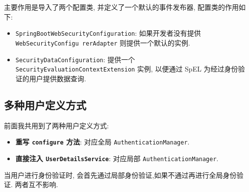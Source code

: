 主要作用是导入了两个配置类, 并定义了一个默认的事件发布器, 配置类的作用如下:
\begin{itemize}
  \item \texttt{SpringBootWebSecurityConfiguration}: 如果开发者没有提供 \texttt{WebSecurityConfigu rerAdapter} 则提供一个默认的实例.
  \item \texttt{SecurityDataConfiguration}: 提供一个 \texttt{SecurityEvaluationContextExtension} 实例, 以便通过 SpEL 为经过身份验证的用户提供数据查询.
\end{itemize}

\subsection{多种用户定义方式}

前面我共用到了两种用户定义方式:
\begin{itemize}
  \item \textbf{重写 \texttt{configure} 方法}: 对应全局 \texttt{AuthenticationManager}.
  \item \textbf{直接注入 \texttt{UserDetailsService}}: 对应局部 \texttt{AuthenticationManager}.
\end{itemize}

当用户进行身份验证时, 会首先通过局部身份验证,如果不通过再进行全局身份验证. 两者互不影响.